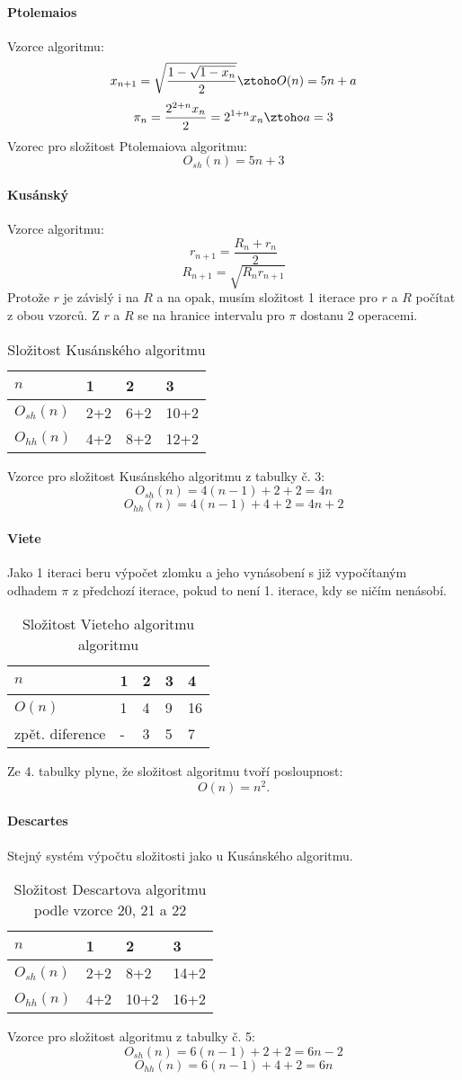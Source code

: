 \documentclass[rocnikovka]{gzwroc} %
\begin{document}
\paragraph{Ptolemaios}
Vzorce algoritmu:
$$
x_{n+1}=\sqrt{\frac{1-\sqrt{1-x_n}}{2}} \ztoho O(n)=5n+a
$$
$$
\pi_n=\frac{2^{2+n}x_n}{2}=2^{1+n}x_n \ztoho a=3
$$
Vzorec pro složitost Ptolemaiova algoritmu:
$$
O_{sh}(n)=5n+3
$$
\paragraph{Kusánský}
Vzorce algoritmu:
$$
r_{n+1}=\frac{R_n+r_n}{2}
$$
$$
R_{n+1}=\sqrt{R_nr_{n+1}}
$$
Protože $r$ je závislý i na $R$ a na opak, musím složitost 1 iterace pro $r$ a $R$ počítat z obou vzorců.  Z $r$ a $R$ se na hranice intervalu pro $\pi$ dostanu 2 operacemi.
\begin{table}[h!]
\caption{Složitost Kusánského algoritmu}
\begin{tabular}{|l||l|l|l|}
\hline
$n$ & 1&2&3 \\ \hline
$O_{sh}(n)$&2+2&6+2&10+2 \\ \hline
$O_{hh}(n)$&4+2&8+2&12+2 \\ \hline
\end{tabular}
\end{table}
Vzorce pro složitost Kusánského algoritmu z tabulky č. 3:
$$
O_{sh}(n)=4(n-1)+2+2=4n
$$
$$
O_{hh}(n)=4(n-1)+4+2=4n+2
$$
\paragraph{Viete}
Jako 1 iteraci beru výpočet zlomku a jeho vynásobení s již vypočítaným odhadem $\pi$ z předchozí iterace, pokud to není 1. iterace, kdy se ničím nenásobí.
\begin{table}[h!]
\caption{Složitost Vieteho algoritmu algoritmu}
\begin{tabular}{|l||l|l|l|l|}
\hline
$n$ & 1&2&3&4 \\ \hline
$O(n)$&1&4&9&16 \\ \hline
zpět. diference&-&3&5&7 \\ \hline
\end{tabular}
\end{table}
Ze 4. tabulky plyne, že složitost algoritmu tvoří posloupnost:
$$
O(n)=n^2.
$$
\paragraph{Descartes}
Stejný systém výpočtu složitosti jako u Kusánského algoritmu.
\begin{table}[h!]
\caption{Složitost Descartova algoritmu podle vzorce 20, 21 a 22}
\begin{tabular}{|l||l|l|l|}
\hline
$n$ & 1&2&3 \\ \hline
$O_{sh}(n)$&2+2&8+2&14+2 \\ \hline
$O_{hh}(n)$&4+2&10+2&16+2 \\ \hline
\end{tabular}
\end{table}
Vzorce pro složitost algoritmu z tabulky č. 5:
$$
O_{sh}(n)=6(n-1)+2+2=6n-2
$$
$$
O_{hh}(n)=6(n-1)+4+2=6n
$$
\end{document}
